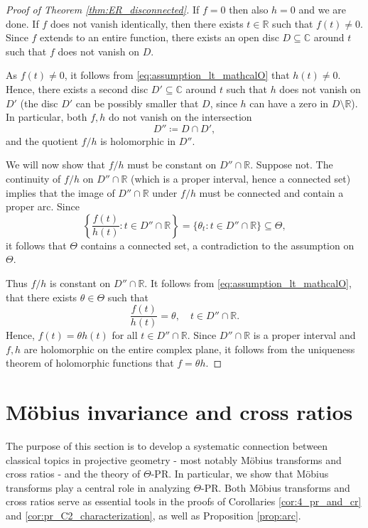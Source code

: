 \documentclass[reqno,a4paper,11pt]{amsart}
\numberwithin{equation}{section}
\def\R{{\mathbb R}}
\def\C{{\mathbb C}}
\newcommand\1{\mathds{1}}
\begin{document}
\begin{proof}[Proof of Theorem \ref{thm:ER_disconnected}]
    If $f=0$ then also $h=0$ and we are done. If $f$ does not vanish identically, then there exists $t \in \R$ such that $f(t) \neq 0$. Since $f$ extends to an entire function, there exists an open disc $D \subseteq \C$ around $t$ such that $f$ does not vanish on $D$.

    As $f(t) \neq 0$, it follows from \eqref{eq:assumption_lt_mathcalO} that $h(t) \neq 0$. Hence, there exists a second disc $D'\subseteq \C$ around $t$ such that $h$ does not vanish on $D'$ (the disc $D'$ can be possibly smaller that $D$, since $h$ can have a zero in $D \setminus \R$).
    In particular, both $f,h$ do not vanish on the intersection
    $$
    D'' \coloneqq D \cap D',
    $$
    and the quotient $f/h$ is holomorphic in $D''$. 
    
    We will now show that $f/h$ must be constant on $D''\cap \R$. Suppose not. The continuity of $f/h$ on $D'' \cap \R$ (which is a proper interval, hence a connected set) implies that the image of $D'' \cap \R$ under $f/h$ must be connected and contain a proper arc. Since
    $$
    \left \{ \frac{f(t)}{h(t)} : t \in D'' \cap \R \right \} = \{ \theta_t : t \in D'' \cap \R \} \subseteq \Theta,
    $$
    it follows that $\Theta$ contains a connected set, a contradiction to the assumption on $\Theta$. 

    Thus $f/h$ is constant on $D''\cap \R$. It follows from \eqref{eq:assumption_lt_mathcalO}, that there exists $\theta \in \Theta$ such that
    $$
    \frac{f(t)}{h(t)} = \theta, \quad t \in D'' \cap \R.
    $$
    Hence, $f(t) = \theta h(t)$ for all $t \in D'' \cap \R$. Since $D'' \cap \R$ is a proper interval and $f,h$ are holomorphic on the entire complex plane, it follows from the uniqueness theorem of holomorphic functions that $f=\theta h$.
\end{proof}

\section{Möbius invariance and cross ratios}\label{sec:moebius}

The purpose of this section is to develop a systematic connection between classical topics in projective geometry - most notably Möbius transforms and cross ratios - and the theory of $\Theta$-PR. In particular, we show that Möbius transforms play a central role in analyzing $\Theta$-PR. Both Möbius transforms and cross ratios serve as essential tools in the proofs of Corollaries \ref{cor:4_pr_and_cr} and \ref{cor:pr_C2_characterization}, as well as Proposition \ref{prop:arc}.
\end{document}

